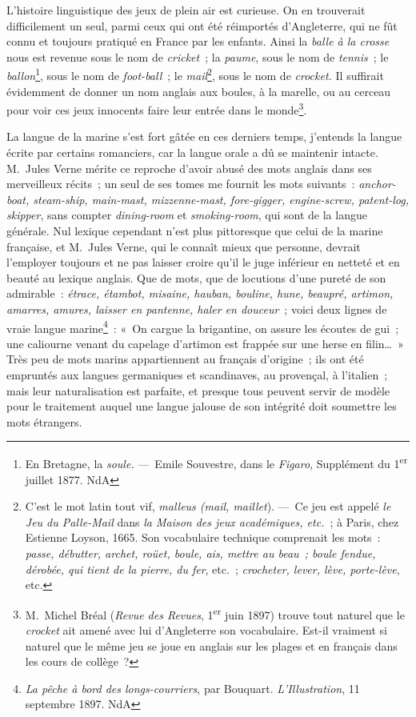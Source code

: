 \documentclass[french,twoside]{book} %
\newcommand\chapterclose{} %
\begin{document}
L’histoire linguistique des jeux de plein air est curieuse. On en trouverait difficilement un seul, parmi ceux qui ont été réimportés d’Angleterre, qui ne fût connu et toujours pratiqué en France par les enfants. Ainsi la {\itshape balle à la crosse} nous est revenue sous le nom de {\itshape cricket} ; la {\itshape paume}, sous le nom de {\itshape tennis} ; le {\itshape ballon}\footnote{En Bretagne, la {\itshape soule.} — Emile Souvestre, dans le {\itshape Figaro}, Supplément du 1\textsuperscript{er} juillet 1877. NdA}, sous le nom de {\itshape foot-ball} ; le {\itshape mail}\footnote{C’est le mot latin tout vif, {\itshape malleus (mail, maillet}). — Ce jeu est appelé {\itshape le Jeu du Palle-Mail} dans {\itshape la Maison des jeux académiques, etc.} ; à Paris, chez Estienne Loyson, 1665. Son vocabulaire technique comprenait les mots : {\itshape passe, débutter, archet, roüet, boule, ais, mettre au beau ; boule fendue, dérobée, qui tient de la pierre, du fer}, etc. ; {\itshape crocheter, lever, lève, porte-lève}, etc.}, sous le nom de {\itshape crocket.} Il suffirait évidemment de donner un nom anglais aux boules, à la marelle, ou au cerceau pour voir ces jeux innocents faire leur entrée dans le monde\footnote{M. Michel Bréal ({\itshape Revue des Revues}, 1\textsuperscript{er} juin 1897) trouve tout naturel que le {\itshape crocket} ait amené avec lui d’Angleterre son vocabulaire. Est-il vraiment si naturel que le même jeu se joue en anglais sur les plages et en français dans les cours de collège ?}.\par
La langue de la marine s’est fort gâtée en ces derniers temps, j’entends la langue écrite par certains romanciers, car la langue orale a dû se maintenir intacte. M. Jules Verne mérite ce reproche d’avoir abusé des mots anglais dans ses merveilleux récits ; un seul de ses tomes me fournit les mots suivants : {\itshape anchor-boat, steam-ship, main-mast, mizzenne-mast, fore-gigger, engine-screw, patent-log, skipper}, sans compter {\itshape dining-room} et {\itshape smoking-room}, qui sont de la langue générale. Nul lexique cependant n’est plus pittoresque que celui de la marine française, et M. Jules Verne, qui le connaît mieux que personne, devrait l’employer toujours et ne pas laisser croire qu’il le juge inférieur en netteté et en beauté au lexique anglais. Que de mots, que de locutions d’une pureté de son admirable : {\itshape étrace, étambot, misaine, hauban, bouline, hune, beaupré, artimon, amarres, amures, laisser en pantenne, haler en douceur} ; voici deux lignes de vraie langue marine\footnote{{\itshape La pêche à bord des longs-courriers}, par Bouquart. {\itshape L’Illustration}, 11 septembre 1897. NdA} : « On cargue la brigantine, on assure les écoutes de gui ; une caliourne venant du capelage d’artimon est frappée sur une herse en filin… » Très peu de mots marins appartiennent au français d’origine ; ils ont été empruntés aux langues germaniques et scandinaves, au provençal, à l’italien ; mais leur naturalisation est parfaite, et presque tous peuvent servir de modèle pour le traitement auquel une langue jalouse de son intégrité doit soumettre les mots étrangers.
\chapterclose
\end{document}
